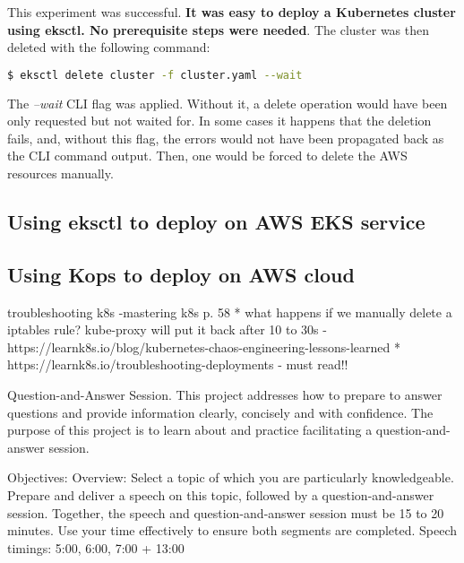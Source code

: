 This experiment was successful. \textbf{It was easy to deploy a Kubernetes cluster using eksctl. No prerequisite steps were needed}. The cluster was then deleted with the following command:
\begin{lstlisting}[basicstyle=\small,caption={Command used to delete Kubernetes cluster with eksctl},captionpos=b,language=Bash,xleftmargin=1cm]
$ eksctl delete cluster -f cluster.yaml --wait
\end{lstlisting}
The \textit{--wait} CLI flag was applied. Without it, a delete operation would have been only requested but not waited for. In some cases it happens that the deletion fails, and, without this flag, the errors would not have been propagated back as the CLI command output. Then, one would be forced to delete the AWS resources manually\cite{eksctl-creating-clusters}.

\subsection{Using eksctl to deploy on AWS EKS service}
\subsection{Using Kops to deploy on AWS cloud}

troubleshooting k8s -mastering k8s p. 58
* what happens if we manually delete a iptables rule? kube-proxy will put it back after 10 to 30s - https://learnk8s.io/blog/kubernetes-chaos-engineering-lessons-learned
* https://learnk8s.io/troubleshooting-deployments - must read!!



Question-and-Answer Session.
This project addresses how to prepare to answer questions and provide information clearly, concisely and with confidence.
The purpose of this project is to learn about and practice facilitating a question-and-answer session.

Objectives:
Overview: Select a topic of which you are particularly knowledgeable. Prepare and deliver a speech on this topic, followed by a question-and-answer session. Together, the speech and question-and-answer session must be 15 to 20 minutes. Use your time effectively to ensure both segments are completed.
Speech timings: 5:00, 6:00, 7:00 + 13:00
